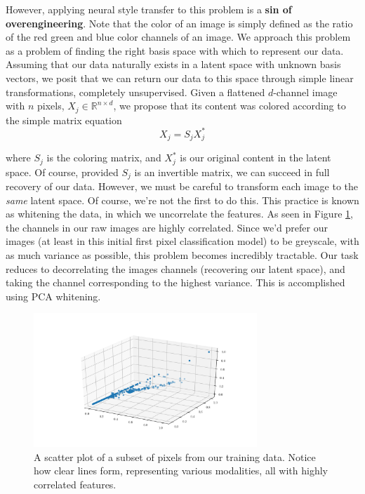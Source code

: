 \documentclass[paper=letter, fontsize=12pt]{article}
\numberwithin{equation}{section} %
\numberwithin{figure}{section} %
\numberwithin{table}{section} %
\begin{document}
However, applying neural style transfer to this problem is a \textbf{sin of
overengineering}. Note that the color of an image is simply defined as the
ratio of the red green and blue color channels of an image.  We approach this
problem as a problem of finding the right basis space with which to represent
our data.  Assuming that our data naturally exists in a latent space with
unknown basis vectors, we posit that we can return our data to this space
through simple linear transformations, completely unsupervised.  Given a
flattened $d$-channel image with $n$ pixels, $X_j \in \mathbb{R}^{n \times d}$,
we propose that its content was colored according to the simple matrix
equation
\begin{equation}
    X_j = S_j X^*_j
\end{equation}

where $S_j$ is the coloring matrix, and $X^*_j$ is our original content in the
latent space.  Of course, provided $S_j$ is an invertible matrix, we can
succeed in full recovery of our data.  However, we must be careful to transform
each image to the \textit{same} latent space.  Of course, we're not the first
to do this.\cite{whiten-stanford}\cite{whiten-mit}  This practice is known as
whitening the data, in which we uncorrelate the features.  As seen in Figure
\ref{fig:correlated-features}, the channels in our raw images are highly
correlated.  Since we'd prefer our images (at least in this initial first pixel
classification model) to be greyscale, with as much variance as possible, this
problem becomes incredibly tractable.  Our task reduces to decorrelating the
images channels (recovering our latent space), and taking the channel
corresponding to the highest variance.  This is accomplished using PCA
whitening.

\begin{figure}
    \centering
    \includegraphics[width=0.75\textwidth]{./figs/correlated-features.png}
    \caption{A scatter plot of a subset of pixels from our training data.
    Notice how clear lines form, representing various modalities, all with
    highly correlated features.}
    \label{fig:correlated-features}
\end{figure}
\end{document}
